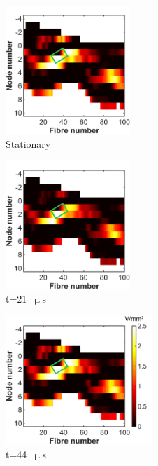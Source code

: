\begin{figure}
    \centering
    \begin{subfigure}[t]{0.32\textwidth}
        \centering
        \includegraphics[height=4.85cm]{Simulations/TimeDep/cathAF-term4-hemi_gnd-stat_0001}
        \caption{Stationary}
        \label{fig:af_stat_cathodic}
    \end{subfigure}%
    \begin{subfigure}[t]{0.32\textwidth}
        \centering
        \includegraphics[height=4.85cm]{Simulations/TimeDep/AF-term4-hemi_gnd-t21_0001}
        \caption{t=21~$ \upmu $s}
        \label{fig:af_t21}
    \end{subfigure}%
    \begin{subfigure}[t]{0.36\textwidth}
        \centering
        \includegraphics[height=4.85cm]{Simulations/TimeDep/AF-term4-hemi_gnd-t44_0001}
        \caption{t=44~$ \upmu $s}
        \label{fig:af_t44}
    \end{subfigure}\\%
    \vspace{1em}%
    \begin{subfigure}[t]{0.32\textwidth}

\end{subfigure}
\end{figure}
